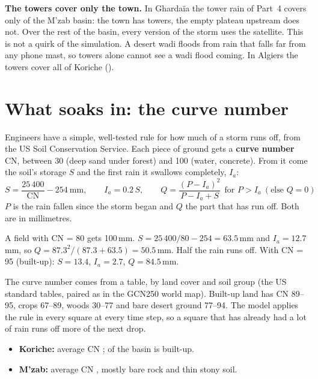 \begin{careful}
\textbf{The towers cover only the town.} In Ghardaïa the tower rain of Part~4 covers only \PfiveGhaTowerShare{} of the
M'zab basin: the town has towers, the empty plateau upstream does not. Over the rest of the basin, every version of the
storm uses the satellite. This is not a quirk of the simulation. A desert wadi floods from rain that falls far from any
phone mast, so towers alone cannot see a wadi flood coming. In Algiers the towers cover all of Koriche (\PfiveAlgTowerShare).
\end{careful}

\section{What soaks in: the curve number}
\label{sec:p5_cn}
Engineers have a simple, well-tested rule for how much of a storm runs off, from the US Soil Conservation Service. Each
piece of ground gets a \textbf{curve number} CN, between 30 (deep sand under forest) and 100 (water, concrete). From it
come the soil's storage $S$ and the first rain it swallows completely, $I_a$:
\begin{equation}
S = \frac{25\,400}{\text{CN}} - 254 \ \text{mm}, \qquad I_a = 0.2\,S, \qquad
Q = \frac{(P - I_a)^2}{P - I_a + S}\ \ \text{for } P > I_a\ (\text{else } Q = 0)
\end{equation}
$P$ is the rain fallen since the storm began and $Q$ the part that has run off. Both are in millimetres.

\begin{example}[: 100 mm on a field]
A field with CN = 80 gets 100\,mm. $S = 25\,400/80 - 254 = 63.5$\,mm and $I_a = 12.7$\,mm, so
$Q = 87.3^2/(87.3 + 63.5) = 50.5$\,mm. Half the rain runs off. With CN = 95 (built-up):
$S = 13.4$, $I_a = 2.7$, $Q = 84.5$\,mm.
\end{example}

The curve number comes from a table, by land cover and soil group (the US standard tables, paired as in the GCN250 world
map). Built-up land has CN 89--95, crops 67--89, woods 30--77 and bare desert ground 77--94. The model applies the rule in
every square at every time step, so a square that has already had a lot of rain runs off more of the next drop.
\begin{itemize}
\item \textbf{Koriche:} average CN \PfiveAlgCN; \PfiveAlgBuilt{} of the basin is built-up.
\item \textbf{M'zab:} average CN \PfiveGhaCN, mostly bare rock and thin stony soil.
\end{itemize}

